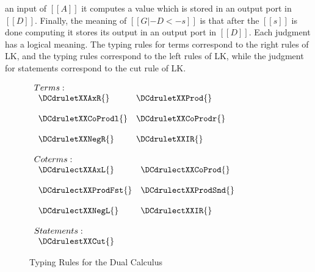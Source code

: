 an input of $[[A]]$ it computes a value which is stored in an output
port in $[[D]]$.  Finally, the meaning of $[[G |- D <- s]]$ is that
after the $[[s]]$ is done computing it stores its output in an output
port in $[[D]]$.  Each judgment has a logical meaning.  The typing
rules for terms correspond to the right rules of LK, and the typing
rules correspond to the left rules of LK, while the judgment for
statements correspond to the cut rule of LK.
\begin{figure}
  \begin{center}
    \begin{math}
      \begin{array}{lll}
        Terms:\\
        \begin{array}{lll}
          \DCdruletXXAxR{} & \DCdruletXXProd{}\\
          &\\
          \DCdruletXXCoProdl{} & \DCdruletXXCoProdr{}\\
          &\\
          \DCdruletXXNegR{} & \DCdruletXXIR{}
        \end{array}\\
        &\\
        Coterms:\\
        \begin{array}{lll}
          \DCdrulectXXAxL{} & \DCdrulectXXCoProd{}\\
          &\\
          \DCdrulectXXProdFst{} & \DCdrulectXXProdSnd{}\\
          &\\
          \DCdrulectXXNegL{} & \DCdrulectXXIR{}
        \end{array}\\
        &\\
        Statements:\\
        \begin{array}{lll}
          \DCdrulestXXCut{}
        \end{array}
      \end{array}
    \end{math}
  \end{center}

  \caption{Typing Rules for the Dual Calculus}
  \label{fig:dc_typing}
\end{figure}

